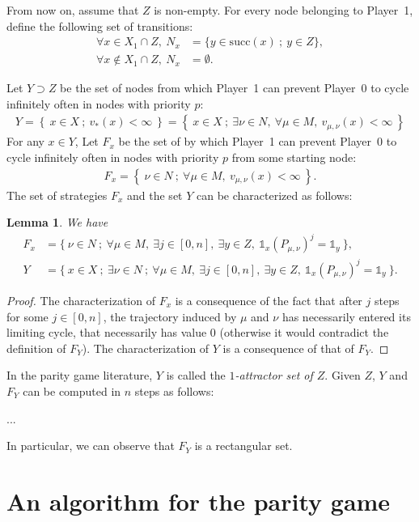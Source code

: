 \documentclass{article}
\newtheorem{lemma}{Lemma}
\def\1{{\mathds 1}}
\def\pa{Player~0}
\def\pb{Player~1}
\def\suc{\mbox{succ}}
\begin{document}
From now on, assume that $Z$ is non-empty. For every node belonging to \pb, define the following set of transitions:
\begin{align}
  \forall x \in X_1 \cap Z,~ N_x &= \{ y \in \suc(x) ~;~ y \in Z \},\\
  \forall x \not\in  X_1 \cap Z,~ N_x & = \emptyset.
\end{align}


Let  $Y \supset Z$ be the set of nodes from which \pb{ }can prevent \pa{ }to cycle infinitely often in nodes with priority $p$:
\begin{align}
Y = \left\{~ x \in X~;~  v_*(x)<\infty  ~\right\} = \left\{~ x \in X~;~  \exists \nu \in N,~ \forall \mu \in M,~ v_{\mu,\nu}(x)<\infty  ~\right\}
\end{align}
For any $x \in Y$, Let $F_x$ be the set of  by which \pb{ }can prevent \pa{ }to cycle infinitely often in nodes with priority $p$ from some starting node:
\begin{align}
F_x = \left\{~ \nu \in N ~;~ \forall \mu \in M,~ v_{\mu,\nu}(x)<\infty ~\right\}.
\end{align}
The set of strategies $F_x$ and the set $Y$ can be characterized as follows:
\begin{lemma}
  We have
  \begin{align}
    F_x &= \{~ \nu \in N ~;~ \forall \mu \in M,~ \exists j \in [0,n],~ \exists y \in Z,~ \1_x (P_{\mu,\nu})^j = \1_y ~\},\\
    Y & = \{~ x \in X~;~ \exists \nu \in N ~;~ \forall \mu \in M,~ \exists j \in [0,n],~ \exists y \in Z,~ \1_x(P_{\mu,\nu})^j = \1_y ~\}.
  \end{align}
\end{lemma}
\begin{proof}
  The characterization of $F_x$ is a consequence of the fact that after $j$ steps for some $j \in [0,n]$, the trajectory induced by $\mu$ and $\nu$ has necessarily entered its limiting cycle, that necessarily has value 0 (otherwise it would contradict the definition of $F_Y$). The characterization of $Y$ is a consequence of that of $F_Y$.
\end{proof}
In the parity game literature, $Y$ is called the \emph{$1$-attractor set of $Z$}. Given $Z$, $Y$ and $F_Y$ can be computed in $n$ steps as follows:

...

In particular, we can observe that $F_Y$ is a rectangular set.



\section{An algorithm for the parity game}
\end{document}
